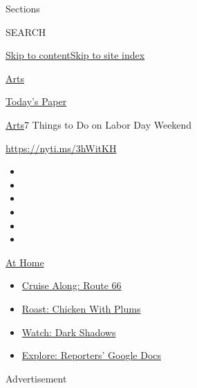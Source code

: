 Sections

SEARCH

\protect\hyperlink{site-content}{Skip to
content}\protect\hyperlink{site-index}{Skip to site index}

\href{https://www.nytimes3xbfgragh.onion/section/arts}{Arts}

\href{https://myaccount.nytimes3xbfgragh.onion/auth/login?response_type=cookie\&client_id=vi}{}

\href{https://www.nytimes3xbfgragh.onion/section/todayspaper}{Today's
Paper}

\href{/section/arts}{Arts}\textbar{}7 Things to Do on Labor Day Weekend

\url{https://nyti.ms/3hWitKH}

\begin{itemize}
\item
\item
\item
\item
\item
\item
\end{itemize}

\href{https://www.nytimes3xbfgragh.onion/spotlight/at-home?action=click\&pgtype=Article\&state=default\&region=TOP_BANNER\&context=at_home_menu}{At
Home}

\begin{itemize}
\tightlist
\item
  \href{https://www.nytimes3xbfgragh.onion/2020/09/07/travel/route-66.html?action=click\&pgtype=Article\&state=default\&region=TOP_BANNER\&context=at_home_menu}{Cruise
  Along: Route 66}
\item
  \href{https://www.nytimes3xbfgragh.onion/2020/09/04/dining/sheet-pan-chicken.html?action=click\&pgtype=Article\&state=default\&region=TOP_BANNER\&context=at_home_menu}{Roast:
  Chicken With Plums}
\item
  \href{https://www.nytimes3xbfgragh.onion/2020/09/04/arts/television/dark-shadows-stream.html?action=click\&pgtype=Article\&state=default\&region=TOP_BANNER\&context=at_home_menu}{Watch:
  Dark Shadows}
\item
  \href{https://www.nytimes3xbfgragh.onion/interactive/2020/at-home/even-more-reporters-editors-diaries-lists-recommendations.html?action=click\&pgtype=Article\&state=default\&region=TOP_BANNER\&context=at_home_menu}{Explore:
  Reporters' Google Docs}
\end{itemize}

Advertisement

